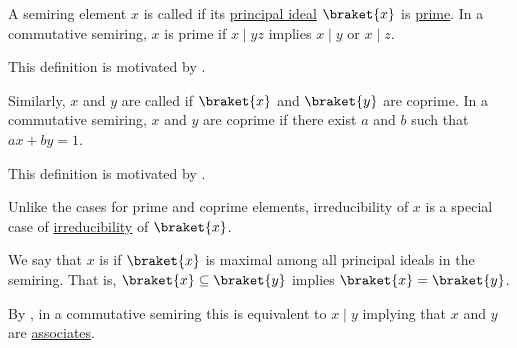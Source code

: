\begin{definition}\label{def:semiring_primality}\mimprovised\hfill
  \begin{thmenum}
     A semiring element \( x \) is called  if its \hyperref[def:semiring_ideal/principal]{principal ideal} \( \braket{ x } \) is \hyperref[def:semiring_ideal/prime]{prime}. In a commutative semiring, \( x \) is prime if \( x \mid yz \) implies \( x \mid y \) or \( x \mid z \).

    This definition is motivated by .

     Similarly, \( x \) and \( y \) are called  if \( \braket{ x } \) and \( \braket{ y } \) are coprime. In a commutative semiring, \( x \) and \( y \) are coprime if there exist \( a \) and \( b \) such that \( ax + by = 1 \).

    This definition is motivated by .

     Unlike the cases for prime and coprime elements, irreducibility of \( x \) is a special case of \hyperref[def:semimring_ideal/irreducible]{irreducibility} of \( \braket{ x } \).

    We say that \( x \) is  if \( \braket{ x } \) is maximal among all principal ideals in the semiring. That is, \( \braket{ x } \subseteq \braket{ y } \) implies \( \braket{ x } = \braket{ y } \).

    By , in a commutative semiring this is equivalent to \( x \mid y \) implying that \( x \) and \( y \) are \hyperref[def:divisibility/associates]{associates}.
  \end{thmenum}
\end{definition}

